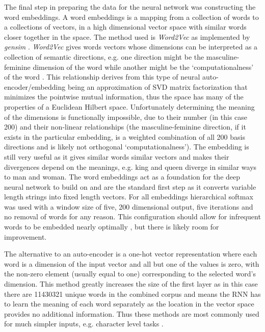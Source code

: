 \documentclass[12pt, a4paper]{article}
\begin{document}
The final step in preparing the data for the neural network was constructing the word embeddings. A word embeddings is a mapping from a collection of words to a collections of vectors, in a high dimensional vector space with similar words closer together in the space\citep{wordembeding}. The method used is \textit{Word2Vec} \citep{mikolov2013efficient} as implemented by \textit{gensim} \citep{rehurek_lrec}. \textit{Word2Vec} gives words vectors whose dimensions can be interpreted as a collection of semantic directions, e.g. one direction might be the masculine-feminine dimension of the word while another might be the `computationalness' of the word \citep{bolukbasi2016man}. This relationship derives from this type of neural auto-encoder/embedding being an approximation of SVD matrix factorization \citep{levy2014neural} that minimizes the pointwise mutual information, thus the space has many of the properties of a Euclidean Hilbert space. Unfortunately determining the meaning of the dimensions is functionally impossible, due to their number (in this case 200) and their non-linear relationships (the masculine-feminine direction, if it exists in the particular embedding, is a weighted combination of all 200 basis directions and is likely not orthogonal `computationalness'). The embedding is still very useful as it gives similar words similar vectors and makes their divergences depend on the meanings, e.g. king and queen diverge in similar ways to man and woman. The word embeddings act as a foundation for the deep neural network to build on and are the standard first step \citep{deep_learning_chapter12} as it converts variable length strings into fixed length vectors. For all embeddings hierarchical softmax was used with a window size of five, 200 dimensional output, five iterations and no removal of words for any reason. This configuration should allow for infrequent words to be embedded nearly optimally  \citep{rehurek_lrec}, but there is likely room for improvement.

The alternative to an auto-encoder is a one-hot vector representation where each word is a dimension of the input vector and all but one of the values is zero, with the non-zero element (usually equal to one) corresponding to the selected word's dimension. This method greatly increases the size of the first layer as in this case there are \num{11430321} unique words in the combined corpus and means the RNN has to learn the meaning of each word separately as the location in the vector space provides no additional information. Thus these methods are most commonly used for much simpler inputs, e.g. character level tasks \citep{rodriguez1999recurrent}.
 
\end{document}
